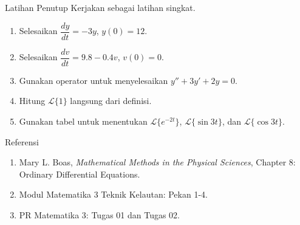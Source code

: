 \documentclass[aspectratio=169,11pt]{beamer}
\newcommand{\lap}[1]{\mathcal{L}\{#1\}}
\begin{document}
\begin{frame}{Latihan Penutup}
Kerjakan sebagai latihan singkat.
\begin{enumerate}
  \item Selesaikan $\dfrac{dy}{dt}=-3y$, $y(0)=12$.
  \item Selesaikan $\dfrac{dv}{dt}=9.8-0.4v$, $v(0)=0$.
  \item Gunakan operator untuk menyelesaikan $y''+3y'+2y=0$.
  \item Hitung $\lap{1}$ langsung dari definisi.
  \item Gunakan tabel untuk menentukan $\lap{e^{-2t}}$, $\lap{\sin 3t}$, dan $\lap{\cos 3t}$.
\end{enumerate}
\end{frame}

\begin{frame}{Referensi}
\begin{enumerate}
  \item Mary L. Boas, \textit{Mathematical Methods in the Physical Sciences}, Chapter 8: Ordinary Differential Equations.
  \item Modul Matematika 3 Teknik Kelautan: Pekan 1-4.
  \item PR Matematika 3: Tugas 01 dan Tugas 02.
\end{enumerate}
\end{frame}
\end{document}
